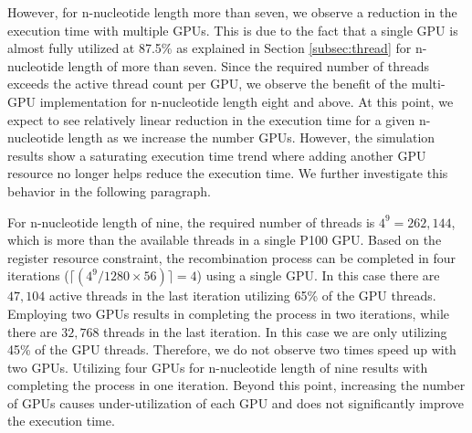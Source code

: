 However, for n-nucleotide length more than seven, we observe a reduction in the execution time with multiple GPUs. This is due to the fact that a single GPU is almost fully utilized at 87.5\% as explained in Section \ref{subsec:thread} for n-nucleotide length of more than seven. Since the required number of threads exceeds the active thread count per GPU, we observe the benefit of the multi-GPU implementation for n-nucleotide length eight and above. At this point, we expect to see relatively linear reduction in the execution time for a given n-nucleotide length as we increase the number GPUs. However, the simulation results show a saturating execution time trend where adding another GPU resource no longer helps reduce the execution time. We further investigate this behavior in the following paragraph.

 
For n-nucleotide length of nine, the required number of threads is $4^9= 262,144$, which is more than the available threads in a single P100 GPU. Based on the register resource constraint, the recombination process can be completed in four iterations ($\lceil(4^9/1280\times56)\rceil=4 $) using a single GPU. In this case there are $47,104$ active threads in the last iteration utilizing 65\% of the GPU threads. Employing two GPUs results in completing the process in two iterations, while there are $32,768$ threads in the last iteration. In this case we are only utilizing 45\% of the GPU threads. Therefore, we do not observe two times speed up with two GPUs. 
Utilizing four GPUs for n-nucleotide length of nine results with completing the process in one iteration. Beyond this point, increasing the number of GPUs causes under-utilization of each GPU and does not significantly improve the execution time.  


